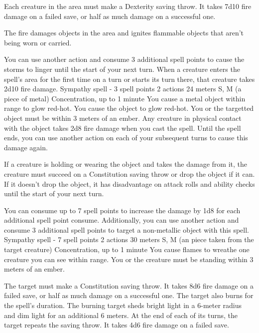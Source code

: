         Each creature in the area must make a Dexterity saving throw.
        It takes 7d10 fire damage on a failed save, or half as much damage on a successful one.

        The fire damages objects in the area and ignites flammable objects that aren't being worn or carried.

        You can use another action and consume 3 additional spell points to cause the storms to linger until the start of your next turn.
        When a creature enters the spell's area for the first time on a turn or starts its turn there, that creature takes 2d10 fire damage.
        {Sympathy spell - 3 spell points}
        {2 actions}
        {24 meters}
        {S, M (a piece of metal)}
        {Concentration, up to 1 minute}
        You cause a metal object within range to glow red-hot.
        You cause the object to glow red-hot.
        You or the targetted object must be within 3 meters of an ember.
        Any creature in physical contact with the object takes 2d8 fire damage when you cast the spell.
        Until the spell ends, you can use another action on each of your subsequent turns to cause this damage again.

        If a creature is holding or wearing the object and takes the damage from it, the creature must succeed on a Constitution saving throw or drop the object if it can.
        If it doesn't drop the object, it has disadvantage on attack rolls and ability checks until the start of your next turn.

        You can consume up to 7 spell points to increase the damage by 1d8 for each additional spell point consume.
        Additionally, you can use another action and consume 3 additional spell points to target a non-metallic object with this spell.
        {Sympathy spell - 7 spell points}
        {2 actions}
        {30 meters}
        {S, M (an piece taken from the target creature)}
        {Concentration, up to 1 minute}
        You cause flames to wreathe one creature you can see within range.
        You or the creature must be standing within 3 meters of an ember.

        The target must make a Constitution saving throw.
        It takes 8d6 fire damage on a failed save, or half as much damage on a successful one.
        The target also burns for the spell's duration.
        The burning target sheds bright light in a 6-meter radius and dim light for an additional 6 meters.
        At the end of each of its turns, the target repeats the saving throw.
        It takes 4d6 fire damage on a failed save.

